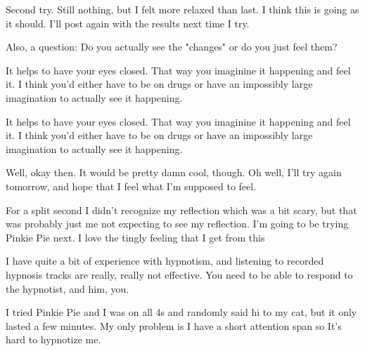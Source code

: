 \documentclass[ebook,12pt,oneside,openany]{memoir}
\newcommand{\mytexttilde}{\raisebox{0.5ex}{\texttildelow}}
\begin{document}
\begin{tcolorbox}[title=Sketchi Inktip Quillwing]
\begin{tcolorbox}[title=nerfman100]
\par{Second try. Still nothing, but I felt more relaxed than last. I think this is going as it should. I'll post again with the results next time I try.}
\newline{}
\par{Also, a question: Do you actually see the "changes" or do you just feel them?}
\end{tcolorbox}
\par{It helps to have your eyes closed. That way you imaginine it happening and feel it. I think you'd either have to be on drugs or have an impossibly large imagination to actually see it happening.}
\end{tcolorbox}
\begin{tcolorbox}[title=Shining Wing,colback=blue!5!white,colframe=blue!75!black,coltitle=white]
\begin{tcolorbox}[title=Sketchi]
\par{It helps to have your eyes closed. That way you imaginine it happening and feel it. I think you'd either have to be on drugs or have an impossibly large imagination to actually see it happening.}
\end{tcolorbox}
\par{Well, okay then. It would be pretty damn cool, though. Oh well, I'll try again tomorrow, and hope that I feel what I'm supposed to feel. }
\end{tcolorbox}
\begin{tcolorbox}[title=Sleepykitty]
\par{For a split second I didn't recognize my reflection which was a bit scary, but that was probably just me not expecting to see my reflection. I'm going to be trying Pinkie Pie next. I love the tingly feeling that I get from this\mytexttilde{}}
\end{tcolorbox}
\begin{tcolorbox}[title=ping111]
\par{I have quite a bit of experience with hypnotism, and listening to recorded hypnosis tracks are really, really not effective. You need to be able to respond to the hypnotist, and him, you.}
\end{tcolorbox}
\begin{tcolorbox}[title=C.B]
\par{I tried Pinkie Pie and I was on all 4s and randomly said hi to my cat, but it only lasted a few minutes. My only problem is I have a short attention span so It's hard to hypnotize me.}
\end{tcolorbox}
\end{document}
